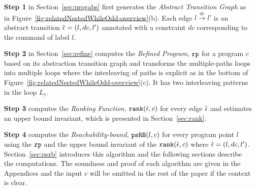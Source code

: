 
\textbf{Step 1}
in Section~\ref{sec:progabs} first 
generates the \emph{Abstract Transition Graph} as in Figure~\ref{fig:relatedNestedWhileOdd-overview}(b).
Each edge $l \xrightarrow{dc} l'$ is an abstract transition $\hat{\mathtt{\epsilon}{}} = (l, dc, l')$ annotated with a constraint $dc$ corresponding to the command of label $l$.

\textbf{Step 2} in Section~\ref{sec:refine}
computes the \emph{Refined Program}, $\mathtt{rp}$ for a program $c$ based on 
its abstraction transition graph and transforms the multiple-paths loops
into multiple loops where
the interleaving of paths is explicit as in the bottom of Figure~\ref{fig:relatedNestedWhileOdd-overview}(c).
It has two interleaving patterns in the loop $L_1$.

\textbf{Step 3} computes the \emph{Ranking Function}, $\mathtt{rank}(\hat{\mathtt{\epsilon}{}}, c)$ 
for every edge $\hat{\mathtt{\epsilon}{}}$ 
and estimates an upper bound invariant, which is presented in Section~\ref{sec:rank}.

\textbf{Step 4}
computes the \emph{Reachability-bound}, $\mathtt{psRB}(l, c)$ for every program point $l$ using the $\mathtt{rp}$ and the upper bound invariant of the $\mathtt{rank}(\hat{\mathtt{\epsilon}{}}, c)$ where $\hat{\mathtt{\epsilon}{}} = (l,dc,l')$.
Section~\ref{sec:psrb} introduces this algorithm and the following sections describe the computations. 
The soundness and proof of each algorithm are given in the Appendices and the input $c$ will be omitted in the rest of the paper if the context is clear.

